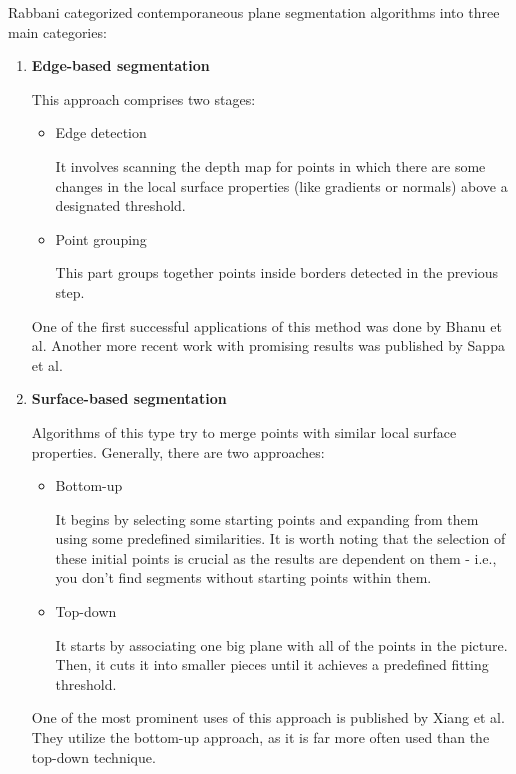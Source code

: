 Rabbani \cite{articleSegPointCloudsSmoothnessConstraint} categorized contemporaneous plane segmentation algorithms
into three main categories:
\begin{enumerate}
\item \textbf{Edge-based segmentation}

This approach comprises two stages:

\begin{itemize}

\item Edge detection

It involves scanning the depth map for points in which there are some changes
in the local surface properties (like gradients or normals) above a designated threshold.

\item Point grouping

This part groups together points inside borders detected in the previous step.

\end{itemize}

One of the first successful applications of this method was done by Bhanu et al. \cite{Bhanu1986RANGEDP}
Another more recent work with promising results was published by Sappa et al. \cite{SappaEdgeDetectionStrategy}

\item \textbf{Surface-based segmentation}

Algorithms of this type try to merge points with similar local surface properties. Generally, there are two approaches:

\begin{itemize}

\item Bottom-up

It begins by selecting some starting points and expanding from them using some predefined similarities.
It is worth noting that the selection of these initial points is crucial as the results are dependent on them - i.e.,
you don't find segments without starting points within them.

\item Top-down

It starts by associating one big plane with all of the points in the picture.
Then, it cuts it into smaller pieces until it achieves a predefined fitting threshold.

\end{itemize}

One of the most prominent uses of this approach is published by Xiang et al. \cite{XiangSurfaceBasedSegmentation}
They utilize the bottom-up approach, as it is far more often used than the top-down technique.


\end{enumerate}
